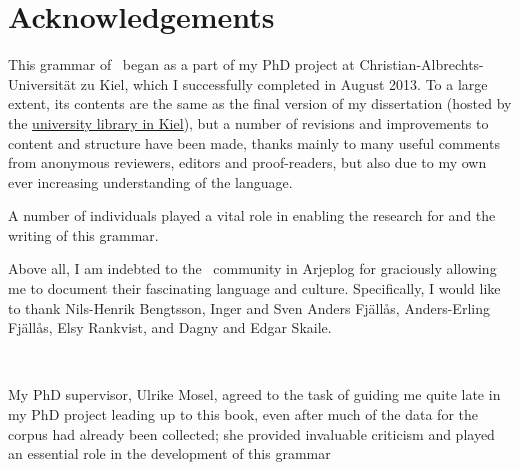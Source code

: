 %



\chapter*{Acknowledgements}\label{acknowledgements}\hypertarget{acknowledgements}{}

This grammar of \PS\ began as a part of my PhD project at Christian-Albrechts-Universität zu Kiel, which I successfully completed in August 2013. To a large extent, its contents are the same as the final version of my dissertation (hosted by the \href{http://macau.uni-kiel.de/receive/dissertation_diss_00013059}{university library in Kiel}), but a number of revisions and improvements to content and structure have been made, thanks mainly to many useful comments from anonymous reviewers, editors and proof-readers, but also due to my own ever increasing understanding of the language. 

A number of individuals played a vital role in enabling the research for and the writing of this grammar. 

\vspace{10pt}
Above all, I am indebted to the \PS\ community in Arjeplog for graciously allowing me to document their fascinating language and culture. %
Specifically, I would like to thank Nils-Henrik Bengtsson, Inger and Sven Anders Fjällås, Anders-Erling Fjällås, Elsy Rankvist, and Dagny and Edgar Skaile. 

{\centering{}\\}
\vspace{10pt}

My PhD supervisor, Ulrike Mosel, agreed to the task of guiding me quite late in my PhD project leading up to this book, even after much of the data for the corpus had already been collected; she provided invaluable criticism and played an essential role in the development of this grammar \textendash\  %

